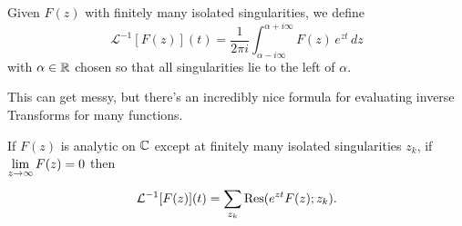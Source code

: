 \documentclass[../m136main.tex]{subfiles}
\begin{document}
\begin{definition}
    Given $F(z)$ with finitely many isolated singularities, we define
    \[ \mathcal L^{-1}[F(z)](t) = \frac{1}{2\pi i} \int_{\alpha - i\infty}^{\alpha + i\infty} F(z) \,e^{zt} \,dz \]
    with $\alpha \in \mathbb{R}$ chosen so that all singularities lie to the left of $\alpha$.
\end{definition}

This can get messy, but there's an incredibly nice formula for evaluating inverse Transforms for many functions.

\begin{theorem}[]
    If $F(z)$ is analytic on $\mathbb{C}$ except at finitely many isolated singularities $z_k$, if $\displaystyle \lim_{z \to \infty} F(z) = 0$ then  \vspace{-6pt}
    \[ \mathcal L^{-1}[F(z)](t) = \sum_{z_k}^{} \operatorname{Res}(e^{zt} F(z); z_k). \]
\end{theorem}
\end{document}
